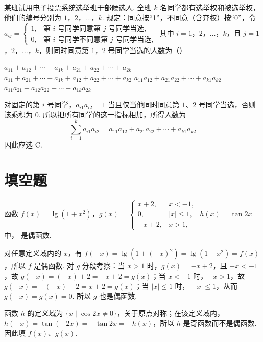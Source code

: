 \begin{problem}
某班试用电子投票系统选举班干部候选人. 全班 \(k\text{ 名}\)同学都有选举权和被选举权，他们的编号分别为 \(1\)，\(2\)，\(\dots\)，\(k\). 规定：同意按“1”，不同意（含弃权）按“0”，令
\(a_{ij}=\begin{cases}
1, & \text{第\ }i\text{\ 号同学同意第 }j\text{\ 号同学当选},\\
0, & \text{第\ }i\text{\ 号同学不同意第 }j\text{\ 号同学当选},
\end{cases}\)
其中 \(i=1\)，\(2\)，\(\dots\)，\(k\)，且 \(j=1\)，\(2\)，\(\dots\)，\(k\)，则同时同意第 \(1\)，\(2\) 号同学当选的人数为（\quad）

\choices
    {\(a_{11}+a_{12}+\cdots+a_{1k}+a_{21}+a_{22}+\cdots+a_{2k}\)}
    {\(a_{11}+a_{21}+\cdots+a_{1k}+a_{12}+a_{22}+\cdots+a_{k2}\)}
    {\(a_{11}a_{12}+a_{21}a_{22}+\cdots+a_{k1}a_{k2}\)}
    {\(a_{11}a_{21}+a_{12}a_{22}+\cdots+a_{1k}a_{2k}\)}

\begin{solution}
对固定的第 \(i\) 号同学，\(a_{i1}a_{i2}=1\) 当且仅当他同时同意第 \(1\)、\(2\) 号同学当选，否则该乘积为 \(0\). 所以把所有同学的这一指标相加，所得人数为
\[
\sum_{i=1}^{k}a_{i1}a_{i2}=a_{11}a_{12}+a_{21}a_{22}+\cdots+a_{k1}a_{k2}
\]
因此应选 C.
\end{solution}
\end{problem}

\section{填空题}
\begin{problem}
函数 \(f(x)=\lg(1+x^2)\)，\(g(x)=
\begin{cases}
x+2, & x<-1,\\
0, & |x|\leqslant 1,\\
-x+2, & x>1,
\end{cases}\)
\(h(x)=\tan 2x\) 中，\fillinblank{} 是偶函数.

\begin{solution}
对任意定义域内的 \(x\)，有 \(f(-x)=\lg(1+(-x)^2)=\lg(1+x^2)=f(x)\)，所以 \(f\) 是偶函数. 对 \(g\) 分段考察：当 \(x>1\) 时，\(g(x)=-x+2\)，且 \(-x<-1\)，故 \(g(-x)=(-x)+2=-x+2=g(x)\)；当 \(x<-1\) 时，\(-x>1\)，故 \(g(-x)=-(-x)+2=x+2=g(x)\)；当 \(\lvert x\rvert\leqslant1\) 时，\(\lvert -x\rvert\leqslant1\)，从而 \(g(-x)=g(x)=0\). 所以 \(g\) 也是偶函数.

函数 \(h\) 的定义域为 \(\{x\mid \cos2x\ne0\}\)，关于原点对称；在该定义域内，\(h(-x)=\tan(-2x)=-\tan2x=-h(x)\)，所以 \(h\) 是奇函数而不是偶函数. 因此填 \(f(x)\)、\(g(x)\).
\end{solution}
\end{problem}

